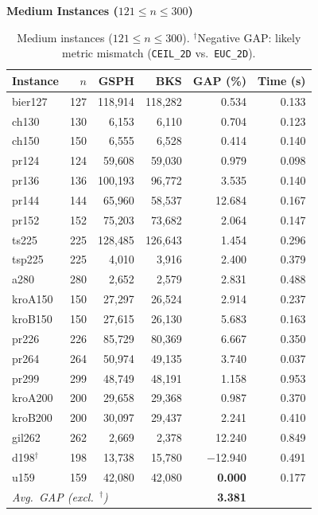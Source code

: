 \documentclass[runningheads]{llncs}
\begin{document}
\textbf{Medium Instances ($121 \le n \le 300$)}

\begin{table}
\caption{Medium instances ($121\!\le\!n\!\le\!300$).
$^{\dagger}$Negative GAP: likely metric mismatch
(\texttt{CEIL\_2D} vs.\ \texttt{EUC\_2D}).}\label{tab:medium}
\centering\small
\begin{tabular}{@{}lrrrrr@{}}
\toprule
\textbf{Instance} & $n$ & \textbf{GSPH} & \textbf{BKS}
  & \textbf{GAP (\%)} & \textbf{Time (s)} \\
\midrule
bier127        & 127 & 118{,}914 & 118{,}282 &   0.534 & 0.133 \\
ch130          & 130 &   6{,}153 &   6{,}110 &   0.704 & 0.123 \\
ch150          & 150 &   6{,}555 &   6{,}528 &   0.414 & 0.140 \\
pr124          & 124 &  59{,}608 &  59{,}030 &   0.979 & 0.098 \\
pr136          & 136 & 100{,}193 &  96{,}772 &   3.535 & 0.140 \\
pr144          & 144 &  65{,}960 &  58{,}537 &  12.684 & 0.167 \\
pr152          & 152 &  75{,}203 &  73{,}682 &   2.064 & 0.147 \\
ts225          & 225 & 128{,}485 & 126{,}643 &   1.454 & 0.296 \\
tsp225         & 225 &   4{,}010 &   3{,}916 &   2.400 & 0.379 \\
a280           & 280 &   2{,}652 &   2{,}579 &   2.831 & 0.488 \\
kroA150        & 150 &  27{,}297 &  26{,}524 &   2.914 & 0.237 \\
kroB150        & 150 &  27{,}615 &  26{,}130 &   5.683 & 0.163 \\
pr226          & 226 &  85{,}729 &  80{,}369 &   6.667 & 0.350 \\
pr264          & 264 &  50{,}974 &  49{,}135 &   3.740 & 0.037 \\
pr299          & 299 &  48{,}749 &  48{,}191 &   1.158 & 0.953 \\
kroA200        & 200 &  29{,}658 &  29{,}368 &   0.987 & 0.370 \\
kroB200        & 200 &  30{,}097 &  29{,}437 &   2.241 & 0.410 \\
gil262         & 262 &   2{,}669 &   2{,}378 &  12.240 & 0.849 \\
d198$^\dagger$ & 198 &  13{,}738 &  15{,}780 &$-$12.940 & 0.491 \\
u159           & 159 &  42{,}080 &  42{,}080 & \textbf{0.000} & 0.177 \\
\midrule
\multicolumn{4}{l}{\textit{Avg.\ GAP (excl.\ $^\dagger$)}}
  & \textbf{3.381} & \\
\bottomrule
\end{tabular}
\end{table}
\end{document}
